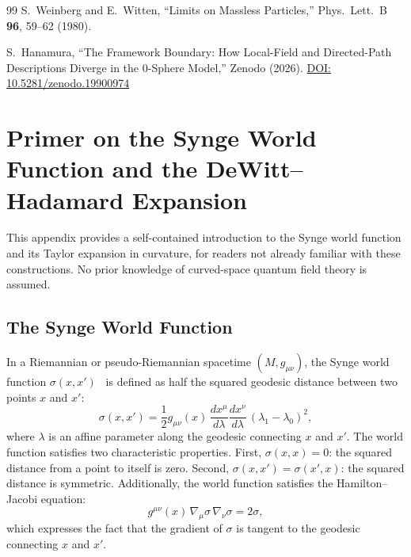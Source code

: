 \documentclass[%
 reprint, amsmath,amssymb, aps, prd, ]{revtex4-2}
\numberwithin{equation}{section}
\begin{document}
\begin{thebibliography}{99}
S.~Weinberg and E.~Witten, ``Limits on Massless Particles,'' Phys.\ Lett.\ B \textbf{96}, 59--62 (1980).

S.~Hanamura, ``The Framework Boundary: How Local-Field and Directed-Path Descriptions Diverge in the 0-Sphere Model,'' Zenodo (2026). \href{https://doi.org/10.5281/zenodo.19900974}{DOI: 10.5281/zenodo.19900974}

\end{thebibliography}

\appendix

\section{Primer on the Synge World Function and the DeWitt--Hadamard Expansion}
\label{app:synge}

This appendix provides a self-contained introduction to the Synge world function and its Taylor expansion in curvature, for readers not already familiar with these constructions.
No prior knowledge of curved-space quantum field theory is assumed.

\subsection{The Synge World Function}

In a Riemannian or pseudo-Riemannian spacetime $(M, g_{\mu\nu})$, the Synge world function $\sigma(x,x')$~\cite{Synge1960} is defined as half the squared geodesic distance between two points $x$ and $x'$:
\begin{equation}
\sigma(x,x') = \frac{1}{2} g_{\mu\nu}(x)\, \frac{dx^\mu}{d\lambda} \frac{dx^\nu}{d\lambda}\, (\lambda_1 - \lambda_0)^2,
\label{app:eq:sigma_def}
\end{equation}
where $\lambda$ is an affine parameter along the geodesic connecting $x$ and $x'$.
The world function satisfies two characteristic properties.
First, $\sigma(x,x) = 0$: the squared distance from a point to itself is zero.
Second, $\sigma(x,x') = \sigma(x',x)$: the squared distance is symmetric.
Additionally, the world function satisfies the Hamilton--Jacobi equation:
\begin{equation}
g^{\mu\nu}(x)\,\nabla_\mu\sigma\,\nabla_\nu\sigma = 2\sigma,
\label{app:eq:hj}
\end{equation}
which expresses the fact that the gradient of $\sigma$ is tangent to the geodesic connecting $x$ and $x'$.
\end{document}

